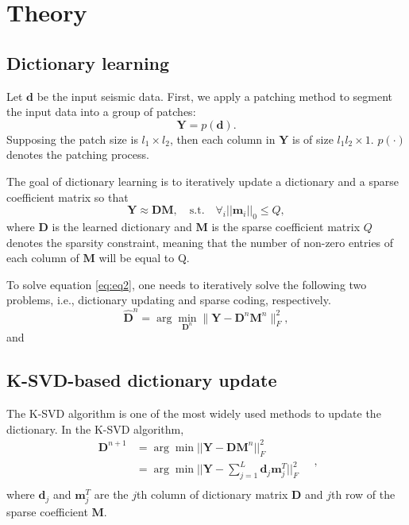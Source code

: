 \section{Theory}
\subsection{Dictionary learning}

Let $\mathbf{d}$ be the input seismic data. First, we apply a patching method to segment the input data into a group of patches:
\begin{equation}
\label{eq:patch}
\mathbf{Y}=p(\mathbf{d}).
\end{equation}
Supposing the patch size is $l_1\times l_2$, then each column in $\mathbf{Y}$ is of size $l_1l_2\times 1$.  $p(\cdot)$ denotes the patching process.

The goal of dictionary learning is to iteratively update a dictionary and a sparse coefficient matrix so that
\begin{equation}
\label{eq:eq2}
\mathbf{Y} \approx \mathbf{D}\mathbf{M}, \quad\text{s.t.}  \quad \forall_i ||\mathbf{m}_{i}||_{0}\le Q,
\end{equation}
where $\mathbf{D}$ is the learned dictionary and $\mathbf{M}$ is the sparse coefficient matrix\new{,} $Q$ denotes the sparsity constraint, meaning that the number of non-zero entries of each column of $\mathbf{M}$ will be equal to Q.  

To solve equation  \ref{eq:eq2}, one needs to iteratively solve the following two problems, i.e., dictionary updating and sparse coding, respectively. 
\begin{equation}
\label{eq:dic}
\hat{\mathbf{D}}^n = \arg\min_{\mathbf{D}^n} \parallel \mathbf{Y} - \mathbf{D}^n\mathbf{M}^n \parallel_F^2, 
\end{equation}
and 

\subsection{K-SVD-based dictionary update}
The K-SVD algorithm is one of the most widely used methods to update the dictionary. 
In the K-SVD algorithm, 
\begin{equation}
\begin{split}
\mathbf{D}^{n+1}&=\arg\min||\mathbf{Y}-\mathbf{D}\mathbf{M}^{n}||^{2}_{F}\\
&=\arg\min||\mathbf{Y}-\sum_{j=1}^{L}\mathbf{d}_{j}\mathbf{m}^{T}_{j}||^{2}_{F}\\
\end{split}\quad,
\end{equation}
where $\mathbf{d}_{j}$ and $\mathbf{m}^T_{j}$ are the $j$th column of dictionary matrix $\mathbf{D}$ and $j$th row of the sparse coefficient $\mathbf{M}$. 

